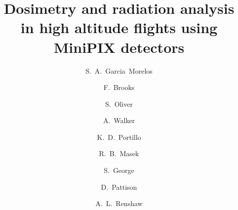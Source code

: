 \documentclass[preprint,12pt]{elsarticle}
\begin{document}
\begin{frontmatter}


\title{Dosimetry and radiation analysis in high altitude flights using MiniPIX detectors}

\author{S.~A.~Garcia~Morelos}
\author{F.~Brooks}
\author{S.~Oliver}
\author{A.~Walker}
\author{K.~D.~Portillo}
\author{R.~B.~Masek}
\author{S.~George}
\author{D.~Pattison}
\author{A.~L.~Renshaw}




\address[label2,label3,label4,label5,label6,label7,label8,label9,label10]{Department of Physics, University of Houston, Houston, TX 77204, USA}


\end{frontmatter}
\end{document}
